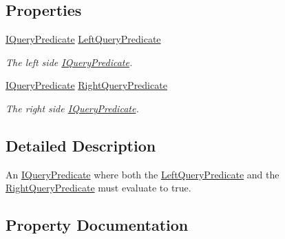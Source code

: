 \subsection*{Properties}
\begin{DoxyCompactItemize}
\item 
\hyperlink{interfaceCqrs_1_1Repositories_1_1Queries_1_1IQueryPredicate}{I\+Query\+Predicate} \hyperlink{interfaceCqrs_1_1Repositories_1_1Queries_1_1IAndQueryPredicate_a35166ddeebe86048dba2e7f03407aa94_a35166ddeebe86048dba2e7f03407aa94}{Left\+Query\+Predicate}
\begin{DoxyCompactList}\small\item\em The left side \hyperlink{interfaceCqrs_1_1Repositories_1_1Queries_1_1IQueryPredicate}{I\+Query\+Predicate}. \end{DoxyCompactList}\item 
\hyperlink{interfaceCqrs_1_1Repositories_1_1Queries_1_1IQueryPredicate}{I\+Query\+Predicate} \hyperlink{interfaceCqrs_1_1Repositories_1_1Queries_1_1IAndQueryPredicate_ab24faa4c3423f91a8d9115b2cae6684b_ab24faa4c3423f91a8d9115b2cae6684b}{Right\+Query\+Predicate}
\begin{DoxyCompactList}\small\item\em The right side \hyperlink{interfaceCqrs_1_1Repositories_1_1Queries_1_1IQueryPredicate}{I\+Query\+Predicate}. \end{DoxyCompactList}\end{DoxyCompactItemize}


\subsection{Detailed Description}
An \hyperlink{interfaceCqrs_1_1Repositories_1_1Queries_1_1IQueryPredicate}{I\+Query\+Predicate} where both the \hyperlink{interfaceCqrs_1_1Repositories_1_1Queries_1_1IAndQueryPredicate_a35166ddeebe86048dba2e7f03407aa94_a35166ddeebe86048dba2e7f03407aa94}{Left\+Query\+Predicate} and the \hyperlink{interfaceCqrs_1_1Repositories_1_1Queries_1_1IAndQueryPredicate_ab24faa4c3423f91a8d9115b2cae6684b_ab24faa4c3423f91a8d9115b2cae6684b}{Right\+Query\+Predicate} must evaluate to true. 



\subsection{Property Documentation}
\mbox{\label{interfaceCqrs_1_1Repositories_1_1Queries_1_1IAndQueryPredicate_a35166ddeebe86048dba2e7f03407aa94_a35166ddeebe86048dba2e7f03407aa94}} 
